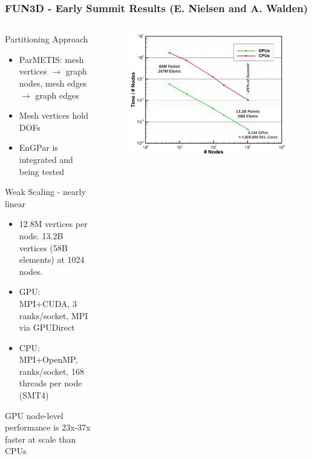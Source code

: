\documentclass[aspectratio=169]{beamer}
\begin{document}
\begin{frame}
  \frametitle{FUN3D - Early Summit Results (E. Nielsen and A. Walden)}
  \begin{columns}
    \begin{column}{0.5\textwidth}
      Partitioning Approach
      \begin{itemize}
        \item ParMETIS: mesh vertices $\rightarrow$ graph nodes,
          mesh edges $\rightarrow$ graph edges
        \item Mesh vertices hold DOFs
        \item EnGPar is integrated and being tested
      \end{itemize}
      Weak Scaling - nearly linear
      \begin{itemize}
        \item 12.8M vertices per node. 13.2B vertices (58B elements) at 1024
          nodes.
        \item GPU: MPI+CUDA, 3 ranks/socket, MPI via GPUDirect
        \item CPU: MPI+OpenMP, ranks/socket, 168 threads per node (SMT4)
      \end{itemize}
      GPU node-level performance is 23x-37x faster at scale than CPUs
    \end{column}
    \begin{column}{0.5\textwidth}
      \begin{figure}
        \centering
        \includegraphics[width=\textwidth]{figures/fun3d-summit.png}
      \end{figure}
    \end{column}
  \end{columns}
\end{frame}
\end{document}
